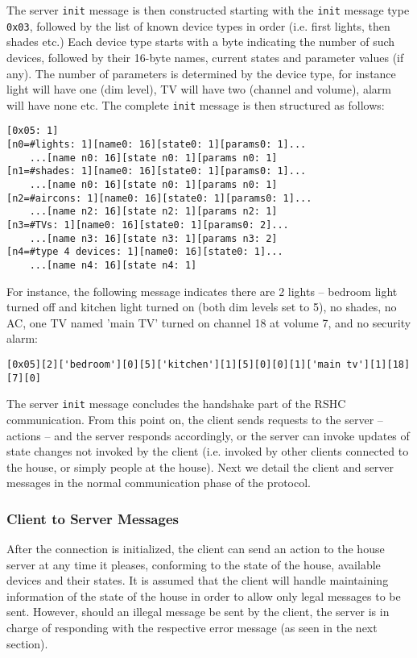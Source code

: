 \noindent
The server {\tt init} message is then constructed starting with the {\tt init} message type {\tt 0x03}, followed by the list of known device types in order (i.e. first lights, then shades etc.) Each device type starts with a byte indicating the number of such devices, followed by their 16-byte names, current states and parameter values (if any). The number of parameters is determined by the device type, for instance light will have one (dim level), TV will have two (channel and volume), alarm will have none etc. The complete {\tt init} message is then structured as follows:

\begin{verbatim}
[0x05: 1]
[n0=#lights: 1][name0: 16][state0: 1][params0: 1]...
    ...[name n0: 16][state n0: 1][params n0: 1]
[n1=#shades: 1][name0: 16][state0: 1][params0: 1]...
    ...[name n0: 16][state n0: 1][params n0: 1]
[n2=#aircons: 1][name0: 16][state0: 1][params0: 1]...
    ...[name n2: 16][state n2: 1][params n2: 1]
[n3=#TVs: 1][name0: 16][state0: 1][params0: 2]...
    ...[name n3: 16][state n3: 1][params n3: 2]
[n4=#type 4 devices: 1][name0: 16][state0: 1]...
    ...[name n4: 16][state n4: 1]
\end{verbatim}

\noindent
For instance, the following message indicates there are 2 lights -- bedroom light turned off and kitchen light turned on (both dim levels set to 5), no shades, no AC, one TV named 'main TV' turned on channel 18 at volume 7, and no security alarm:

\begin{verbatim}
[0x05][2]['bedroom'][0][5]['kitchen'][1][5][0][0][1]['main tv'][1][18][7][0]
\end{verbatim}

\noindent
The server {\tt init} message concludes the handshake part of the RSHC communication. From this point on, the client sends requests to the server -- actions -- and the server responds accordingly, or the server can invoke updates of state changes not invoked by the client (i.e. invoked by other clients connected to the house, or simply people at the house). Next we detail the client and server messages in the normal communication phase of the protocol.


\subsubsection{Client to Server Messages}
\label{sec:pdus:pdu:c_to_s}

After the connection is initialized, the client can send an action to the house server at any time it pleases, conforming to the state of the house, available devices and their states. It is assumed that the client will handle maintaining information of the state of the house in order to allow only legal messages to be sent. However, should an illegal message be sent by the client, the server is in charge of responding with the respective error message (as seen in the next section).

